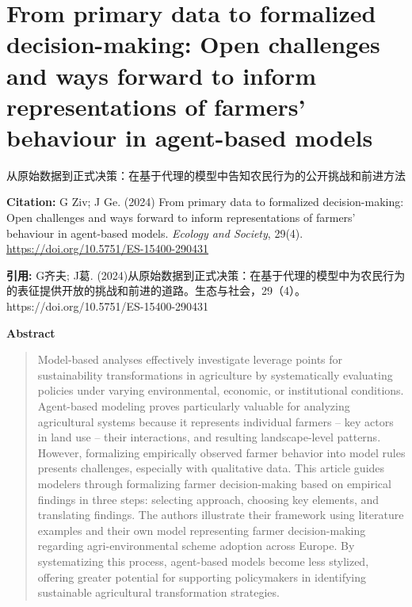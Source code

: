 \vspace{0.5em}
\chapter{From primary data to formalized decision-making: Open challenges and ways forward to inform representations of farmers' behaviour in agent-based models}
\begin{center}\small 从原始数据到正式决策：在基于代理的模型中告知农民行为的公开挑战和前进方法\end{center}

\noindent\textbf{Citation:} G Ziv; J Ge. (2024) From primary data to formalized decision-making: Open challenges and ways forward to inform representations of farmers' behaviour in agent-based models. \textit{Ecology and Society}, 29(4). \url{https://doi.org/10.5751/ES-15400-290431}

\vspace{0.5em}
\noindent\textbf{引用:} G齐夫; J葛. (2024)从原始数据到正式决策：在基于代理的模型中为农民行为的表征提供开放的挑战和前进的道路。生态与社会，29（4）。 https://doi.org/10.5751/ES-15400-290431

\vspace{1.5em}
\noindent\textbf{Abstract}\par
\begin{quote}\small
Model-based analyses effectively investigate leverage points for sustainability transformations in agriculture by systematically evaluating policies under varying environmental, economic, or institutional conditions. Agent-based modeling proves particularly valuable for analyzing agricultural systems because it represents individual farmers -- key actors in land use -- their interactions, and resulting landscape-level patterns. However, formalizing empirically observed farmer behavior into model rules presents challenges, especially with qualitative data. This article guides modelers through formalizing farmer decision-making based on empirical findings in three steps: selecting approach, choosing key elements, and translating findings. The authors illustrate their framework using literature examples and their own model representing farmer decision-making regarding agri-environmental scheme adoption across Europe. By systematizing this process, agent-based models become less stylized, offering greater potential for supporting policymakers in identifying sustainable agricultural transformation strategies.
\end{quote}

